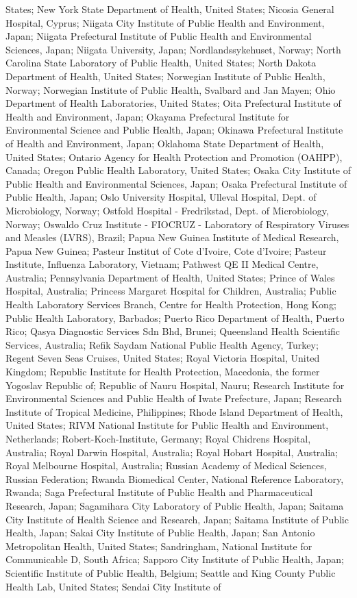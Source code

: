 \begin{appendixbox}
States; New York State Department of Health, United States; Nicosia General Hospital, Cyprus; Niigata City Institute of Public Health and Environment, Japan; Niigata Prefectural Institute of Public Health and Environmental Sciences, Japan; Niigata University, Japan; Nordlandssykehuset, Norway; North Carolina State Laboratory of Public Health, United States; North Dakota Department of Health, United States; Norwegian Institute of Public Health, Norway; Norwegian Institute of Public Health, Svalbard and Jan Mayen; Ohio Department of Health Laboratories, United States; Oita Prefectural Institute of Health and Environment, Japan; Okayama Prefectural Institute for Environmental Science and Public Health, Japan; Okinawa Prefectural Institute of Health and Environment, Japan; Oklahoma State Department of Health, United States; Ontario Agency for Health Protection and Promotion (OAHPP), Canada; Oregon Public Health Laboratory, United States; Osaka City Institute of Public Health and Environmental Sciences, Japan; Osaka Prefectural Institute of Public Health, Japan; Oslo University Hospital, Ulleval Hospital, Dept. of Microbiology, Norway; Ostfold Hospital - Fredrikstad, Dept. of Microbiology, Norway; Oswaldo Cruz Institute - FIOCRUZ - Laboratory of Respiratory Viruses and Measles (LVRS), Brazil; Papua New Guinea Institute of Medical Research, Papua New Guinea; Pasteur Institut of Cote d'Ivoire, Cote d'Ivoire; Pasteur Institute, Influenza Laboratory, Vietnam; Pathwest QE II Medical Centre, Australia; Pennsylvania Department of Health, United States; Prince of Wales Hospital, Australia; Princess Margaret Hospital for Children, Australia; Public Health Laboratory Services Branch, Centre for Health Protection, Hong Kong; Public Health Laboratory, Barbados; Puerto Rico Department of Health, Puerto Rico; Qasya Diagnostic Services Sdn Bhd, Brunei; Queensland Health Scientific Services, Australia; Refik Saydam National Public Health Agency, Turkey; Regent Seven Seas Cruises, United States; Royal Victoria Hospital, United Kingdom; Republic Institute for Health Protection, Macedonia, the former Yogoslav Republic of; Republic of Nauru Hospital, Nauru; Research Institute for Environmental Sciences and Public Health of Iwate Prefecture, Japan; Research Institute of Tropical Medicine, Philippines; Rhode Island Department of Health, United States; RIVM National Institute for Public Health and Environment, Netherlands; Robert-Koch-Institute, Germany; Royal Chidrens Hospital, Australia; Royal Darwin Hospital, Australia; Royal Hobart Hospital, Australia; Royal Melbourne Hospital, Australia; Russian Academy of Medical Sciences, Russian Federation; Rwanda Biomedical Center, National Reference Laboratory, Rwanda; Saga Prefectural Institute of Public Health and Pharmaceutical Research, Japan; Sagamihara City Laboratory of Public Health, Japan; Saitama City Institute of Health Science and Research, Japan; Saitama Institute of Public Health, Japan; Sakai City Institute of Public Health, Japan; San Antonio Metropolitan Health, United States; Sandringham, National Institute for Communicable D, South Africa; Sapporo City Institute of Public Health, Japan; Scientific Institute of Public Health, Belgium; Seattle and King County Public Health Lab, United States; Sendai City Institute of 
\end{appendixbox}
